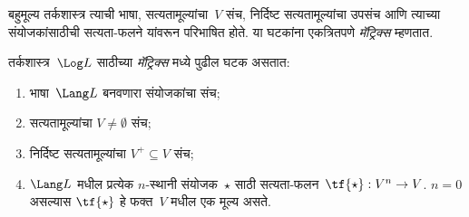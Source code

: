 \documentclass[../../../include/open-logic-section]{subfiles}
\begin{document}


बहुमूल्य तर्कशास्त्र त्याची भाषा, सत्यतामूल्यांचा~$V$ संच,
निर्दिष्ट सत्यतामूल्यांचा उपसंच आणि त्याच्या संयोजकांसाठीची
सत्यता-फलने यांवरून परिभाषित होते. या घटकांना एकत्रितपणे
\emph{मॅट्रिक्स} म्हणतात.

\begin{defn}[मॅट्रिक्स]
तर्कशास्त्र~$\Log L$ साठीच्या \emph{मॅट्रिक्स} मध्ये पुढील घटक असतात:
\begin{enumerate}
\item भाषा~$\Lang L$ बनवणारा संयोजकांचा संच;
\item सत्यतामूल्यांचा $V \neq \emptyset$ संच;
\item निर्दिष्ट सत्यतामूल्यांचा $V^+ \subseteq V$ संच;
\item $\Lang L$ मधील प्रत्येक $n$-स्थानी संयोजक~$\star$ साठी
  सत्यता-फलन~$\tf{\star} : V^n \to V$. $n = 0$ असल्यास
  $\tf{\star}$ हे फक्त~$V$ मधील एक मूल्य असते.
\end{enumerate}
\end{defn}
\end{document}

